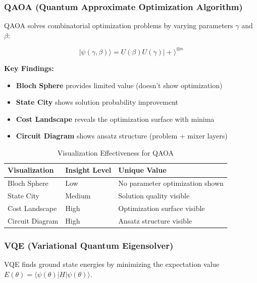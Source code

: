 \documentclass[12pt,a4paper]{article}
\begin{document}
\subsubsection{QAOA (Quantum Approximate Optimization Algorithm)}

QAOA solves combinatorial optimization problems by varying parameters $\gamma$ and $\beta$:

\begin{equation}
	|\psi(\gamma, \beta)\rangle = U(\beta) U(\gamma) |+\rangle^{\otimes n}
\end{equation}

\textbf{Key Findings:}

\begin{itemize}
	\item \textbf{Bloch Sphere} provides limited value (doesn't show optimization)
	\item \textbf{State City} shows solution probability improvement
	\item \textbf{Cost Landscape} reveals the optimization surface with minima
	\item \textbf{Circuit Diagram} shows ansatz structure (problem + mixer layers)
\end{itemize}

\begin{table}[h!]
	\centering
	\caption{Visualization Effectiveness for QAOA}
	\label{tab:qaoa_visualization}
	\begin{tabular}{@{}lll@{}}
		\toprule
		\textbf{Visualization} & \textbf{Insight Level} & \textbf{Unique Value}           \\ \midrule
		Bloch Sphere           & Low                    & No parameter optimization shown \\
		State City             & Medium                 & Solution quality visible        \\
		Cost Landscape         & High                   & Optimization surface visible    \\
		Circuit Diagram        & High                   & Ansatz structure visible        \\ \bottomrule
	\end{tabular}
\end{table}

\subsubsection{VQE (Variational Quantum Eigensolver)}

VQE finds ground state energies by minimizing the expectation value $E(\theta) = \langle\psi(\theta)|H|\psi(\theta)\rangle$.
\end{document}
